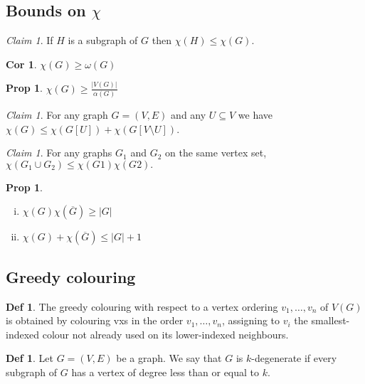 \documentclass[11pt, fleqn, a4paper, landscape]{article}
\theoremstyle{plain} %
\newtheorem{pro}[thm]{Prop}
\newtheorem{cor}[thm]{Cor}
\theoremstyle{remark} %
\newtheorem{claim}[thm]{Claim}
\theoremstyle{definition} %
\newtheorem{defi}[thm]{Def}
\begin{document}
\begin{multicols}{5}
\addtocounter{subsection}{1}
\addtocounter{thm}{1}\addtocounter{thm}{1}
\subsection{Bounds on $\chi$}
\begin{claim}
If $H$ is a subgraph of $G$ then $\chi(H) \le \chi(G)$.
\end{claim}

\begin{cor}
$\chi(G) \ge \omega(G)$
\end{cor}
\addtocounter{thm}{1}
\begin{pro}
$\chi(G) \ge\frac{|V (G)|}{\alpha(G)}$
\end{pro}

\begin{claim}
For any graph $G = (V,E)$ and any $U \subseteq V$ we have $\chi(G) \le \chi(G[U]) + \chi(G[V \setminus U])$.
\end{claim}

\begin{claim}
For any graphs $G_1$ and $G_2$ on the same vertex set, $\chi(G_1 \cup G_2) \le \chi(G1)\chi(G2).$
\end{claim}


\begin{pro}
\begin{enumerate}[(i)]
\item $\chi(G)\chi(\overline{G})\ge |G|$
\item $\chi(G)+\chi(\overline{G})\le |G|+1$
\end{enumerate}
\end{pro}

\subsection{Greedy colouring}

\begin{defi}
The greedy colouring with respect to a vertex ordering $v_1, \dots , v_n$ of $V (G)$ is obtained by colouring vxs in the order $v_1, \dots , v_n$, assigning to $v_i$ the smallest-indexed colour not already used on its lower-indexed neighbours.
\end{defi}
\addtocounter{thm}{1}
\begin{defi}
Let $G = (V,E)$ be a graph. We say that $G$ is $k$-degenerate if every subgraph of $G$ has a vertex of degree less than or equal to $k$.
\end{defi}


\end{multicols}
\end{document}
